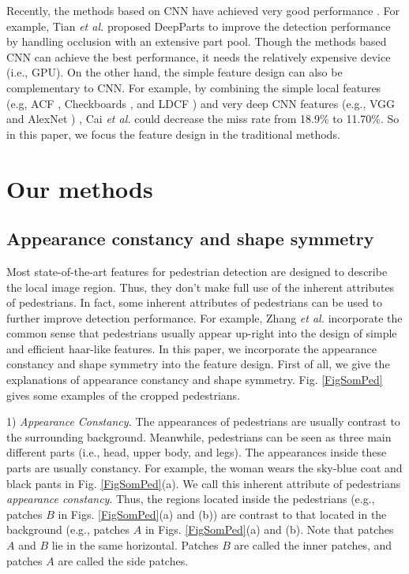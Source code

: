 \documentclass[10pt,twocolumn,letterpaper]{article}
\begin{document}
Recently, the methods based on CNN have achieved very good performance \cite{Cai_DeepPed_ICCV_2015,Luo_SDN_CVPR_2014,Tian_DeepParts_ICCV_2015,Tian_Ta_CVPR_2015,Yang_CCF_ICCV_2015}. For example, Tian \textit{et al.} \cite{Tian_DeepParts_ICCV_2015} proposed DeepParts to improve the
detection performance by handling occlusion
with an extensive part pool. Though the methods based CNN can achieve 
the best performance, it needs the relatively expensive device (i.e., GPU). 
On the other hand, the simple feature design can also be complementary to 
CNN. For example, by combining the simple local features (e.g, ACF \cite{Dollar_ACF_PAMI_2014}, Checkboards \cite{Zhang_FCF_CVPR_2015}, and LDCF \cite{Nam_LDCF_NIPS_2014}) and 
very deep CNN features (e.g., VGG \cite{Simonyan_VGG_arxiv_2014} and AlexNet \cite{Krizhevsky_AlexNet_NIPS_2012}) , Cai \textit{et al.} \cite{Cai_DeepPed_ICCV_2015} could decrease the miss 
rate from 18.9{\%} to 11.70{\%}. So in this paper, we focus the feature design in the traditional methods.

\section{Our methods}
\subsection{Appearance constancy and shape symmetry}
Most state-of-the-art features for pedestrian detection are designed to 
describe the local image region. Thus, they don't make full use of the 
inherent attributes of pedestrians. In fact, some inherent attributes of 
pedestrians can be used to further improve detection performance. For 
example, Zhang \textit{et al.} \cite{Zhang_Info.Haar_CVPR_2014} incorporate the common sense that pedestrians usually 
appear up-right into the design of simple and efficient haar-like features. 
In this paper, we incorporate the appearance constancy and shape symmetry 
into the feature design. First of all, we give the explanations of 
appearance constancy and shape symmetry. Fig. \ref{FigSomPed} gives some examples of the 
cropped pedestrians.

1) \textit{Appearance Constancy.} The appearances of pedestrians are usually contrast to the surrounding 
background. Meanwhile, pedestrians can be seen as three main different parts 
(i.e., head, upper body, and legs). The appearances inside these parts are 
usually constancy. For example, the woman wears the sky-blue coat and black 
pants in Fig. \ref{FigSomPed}(a). We call this inherent attribute of pedestrians 
\textit{appearance constancy}. 
Thus, the regions located inside the pedestrians (e.g., patches $B$ in Figs. \ref{FigSomPed}(a) and (b)) are contrast to that located in the background (e.g., patches $A$ in Figs. \ref{FigSomPed}(a) and (b). Note that patches $A$ and $B$ lie in the same horizontal. Patches $B$ are called the inner patches, and patches $A$ are called the side patches. 
\end{document}
